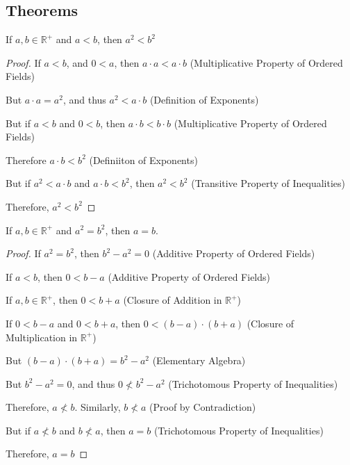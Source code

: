 \documentclass[crop=false,class=book,oneside]{standalone}
\begin{document}
        \subsection{Theorems}
            \begin{theorem}
                \label{%
                    Theorem:MathEnc:Analysis:Sum:SqurPresIneqPosNum%
                }
                If $a,b\in\mathbb{R}^{+}$ and $a<b$,
                then $a^{2}<b^{2}$
            \end{theorem}
            \begin{proof}
                If $a<b$, and $0<a$, then $a\cdot a<a\cdot b$
                \hfill
                (Multiplicative Property of Ordered Fields)\par
                But $a\cdot a = a^{2}$, and thus $a^{2}<a\cdot b$
                \hfill
                (Definition of Exponents)\par
                But if $a<b$ and $0<b$, then $a\cdot b<b\cdot b$
                \hfill
                (Multiplicative Property of Ordered Fields)\par
                Therefore $a\cdot b<b^{2}$
                \hfill
                (Definiiton of Exponents)\par
                But if $a^{2}<a\cdot b$ and $a\cdot b<b^{2}$,
                then $a^{2}<b^{2}$
                \hfill
                (Transitive Property of Inequalities)\par
                Therefore, $a^{2}<b^{2}$
            \end{proof}
            \begin{theorem}
                If $a,b\in\mathbb{R}^{+}$ and $a^{2}=b^{2}$,
                then $a=b$.
            \end{theorem}
            \begin{proof}
                If $a^{2}=b^{2}$, then $b^{2}-a^{2}=0$\hfill
                (Additive Property of Ordered Fields)\par
                If $a<b$, then $0<b-a$\hfill
                (Additive Property of Ordered Fields)\par
                If $a,b\in\mathbb{R}^{+}$, then $0<b+a$
                \hfill
                (Closure of Addition in $\mathbb{R}^{+}$)\par
                If $0<b-a$ and $0<b+a$, then $0<(b-a)\cdot (b+a)$
                \hfill
                (Closure of Multiplication in $\mathbb{R}^{+}$)\par
                But $(b-a)\cdot(b+a)=b^{2}-a^{2}$
                \hfill
                (Elementary Algebra)\par
                But $b^{2}-a^{2}=0$, and thus $0\not<b^{2}-a^{2}$
                \hfill
                (Trichotomous Property of Inequalities)\par
                Therefore, $a\not<b$. Similarly, $b\not<a$
                \hfill
                (Proof by Contradiction)\par
                But if $a\not<b$ and $b\not<a$, then $a=b$
                \hfill
                (Trichotomous Property of Inequalities)\par
                Therefore, $a=b$
            \end{proof}
\end{document}

